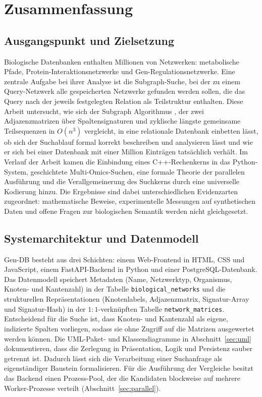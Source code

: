 \documentclass[a4paper,12pt, twoside]{report}
\theoremstyle{definition}
\begin{document}
\section{Zusammenfassung}
\label{sec:zusammenfassung}

\subsection{Ausgangspunkt und Zielsetzung}

Biologische Datenbanken enthalten Millionen von Netzwerken: metabolische Pfade, Protein-Interaktionsnetzwerke und Gen-Regulationsnetzwerke. Eine zentrale Aufgabe bei ihrer Analyse ist die Subgraph-Suche, bei der zu einem Query-Netzwerk alle gespeicherten Netzwerke gefunden werden sollen, die das Query nach der jeweils festgelegten Relation als Teilstruktur enthalten. Diese Arbeit untersucht, wie sich der Subgraph Algorithmus \cite{epp2026subgraph}, der zwei Adjazenzmatrizen über Spaltensignaturen und zyklische längste gemeinsame Teilsequenzen in $O(n^3)$ vergleicht, in eine relationale Datenbank einbetten lässt, ob sich der Suchablauf formal korrekt beschreiben und analysieren lässt und wie er sich bei einer Datenbank mit einer Million Einträgen tatsächlich verhält. Im Verlauf der Arbeit kamen die Einbindung eines C++-Rechenkerns in das Python-System, geschichtete Multi-Omics-Suchen, eine formale Theorie der parallelen Ausführung und die Verallgemeinerung des Suchkerns durch eine universelle Kodierung hinzu. Die Ergebnisse sind dabei unterschiedlichen Evidenzarten zugeordnet: mathematische Beweise, experimentelle Messungen auf synthetischen Daten und offene Fragen zur biologischen Semantik werden nicht gleichgesetzt.

\subsection{Systemarchitektur und Datenmodell}

Gen-DB besteht aus drei Schichten: einem Web-Frontend in HTML, CSS und JavaScript, einem FastAPI-Backend in Python und einer PostgreSQL-Datenbank. Das Datenmodell speichert Metadaten (Name, Netzwerktyp, Organismus, Knoten- und Kantenzahl) in der Tabelle \texttt{biological\_networks} und die strukturellen Repräsentationen (Knotenlabels, Adjazenzmatrix, Signatur-Array und Signatur-Hash) in der $1{:}1$-verknüpften Tabelle \texttt{network\_matrices}. Entscheidend für die Suche ist, dass Knoten- und Kantenzahl als eigene, indizierte Spalten vorliegen, sodass sie ohne Zugriff auf die Matrizen ausgewertet werden können. Die UML-Paket- und Klassendiagramme in Abschnitt~\ref{sec:uml} dokumentieren, dass die Zerlegung in Präsentation, Logik und Persistenz sauber getrennt ist. Dadurch lässt sich die Verarbeitung einer Suchanfrage als eigenständiger Baustein formalisieren. Für die Ausführung der Vergleiche besitzt das Backend einen Prozess-Pool, der die Kandidaten blockweise auf mehrere Worker-Prozesse verteilt (Abschnitt~\ref{sec:parallel}).
\end{document}

